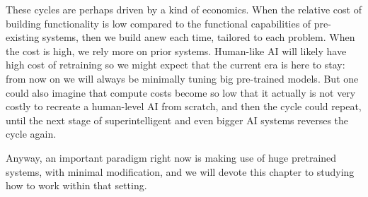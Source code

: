 These cycles are perhaps driven by a kind of economics. When the relative cost of building functionality is low compared to the functional capabilities of pre-existing systems, then we build anew each time, tailored to each problem. When the cost is high, we rely more on prior systems. Human-like AI will likely have high cost of retraining so we might expect that the current era is here to stay: from now on we will always be minimally tuning big pre-trained models. But one could also imagine that compute costs become so low that it actually is not very costly to recreate a human-level AI from scratch, and then the cycle could repeat, until the next stage of superintelligent and even bigger AI systems reverses the cycle again.

Anyway, an important paradigm right now is making use of huge pretrained systems, with minimal modification, and we will devote this chapter to studying how to work within that setting.

